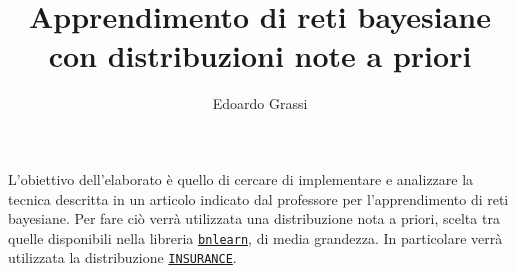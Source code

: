 \documentclass[a4paper, 10pt]{article}
\title{Apprendimento di reti bayesiane con distribuzioni note a priori}
\author{Edoardo Grassi}
\date{\vspace{-5ex}}
\begin{document}
\maketitle

L'obiettivo dell'elaborato è quello di cercare di implementare e analizzare la tecnica descritta
in un articolo indicato dal professore per l'apprendimento di reti bayesiane.
Per fare ciò verrà utilizzata una distribuzione nota a priori, scelta tra quelle disponibili nella libreria 
\href{https://www.bnlearn.com/}{\texttt{bnlearn}}, di media grandezza. In particolare verrà utilizzata la 
distribuzione \href{https://www.bnlearn.com/bnrepository/discrete-medium.html#insurance}{\texttt{INSURANCE}}.






\end{document}
